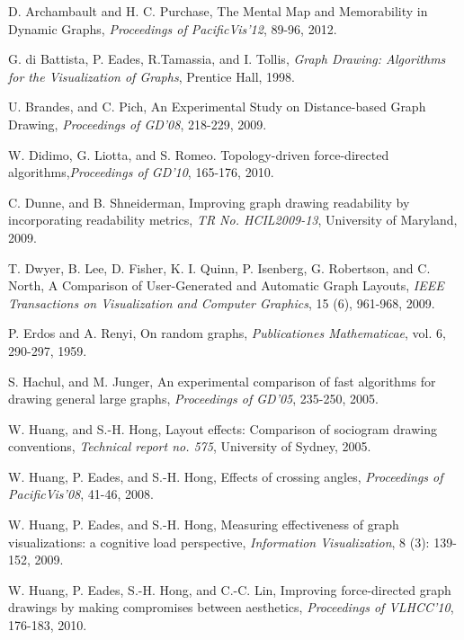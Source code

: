 \documentclass[conference,letterpaper]{IEEEtran}
\begin{document}
\begin{thebibliography}{99}


D. Archambault and H. C. Purchase, The Mental Map and Memorability in Dynamic Graphs, \emph{Proceedings of PacificVis'12}, 89-96, 2012.

G. di Battista, P. Eades, R.Tamassia, and I. Tollis, \emph{Graph Drawing: Algorithms for the Visualization of Graphs}, Prentice Hall, 1998.

U. Brandes, and C. Pich, An Experimental Study on Distance-based Graph Drawing, \emph{Proceedings of GD'08}, 218-229, 2009. 


W. Didimo, G. Liotta, and S. Romeo. Topology-driven force-directed algorithms,\emph{Proceedings of GD'10}, 165-176, 2010.

C. Dunne, and B. Shneiderman, Improving graph drawing
readability by incorporating readability metrics, \emph{TR No. HCIL2009-13}, University of Maryland, 2009.

T. Dwyer, B. Lee, D. Fisher, K. I. Quinn, P. Isenberg, G. Robertson, and C. North, A Comparison of User-Generated and Automatic Graph Layouts, \emph{IEEE Transactions on Visualization and Computer Graphics}, 15 (6), 961-968, 2009.



P. Erdos and A. Renyi, On random graphs, \emph{Publicationes Mathematicae}, vol. 6, 290-297, 1959.

S. Hachul, and M. Junger, An experimental comparison of fast algorithms for drawing general large graphs, \emph{Proceedings of GD'05}, 235-250, 2005.

W. Huang,  and S.-H. Hong, Layout effects: Comparison of sociogram drawing conventions, \emph{Technical report no. 575}, University of Sydney, 2005.


W. Huang, P. Eades, and S.-H. Hong, Effects of crossing angles, \emph{Proceedings of PacificVis'08}, 41-46, 2008.

W. Huang, P. Eades, and S.-H. Hong, Measuring effectiveness of graph visualizations: a cognitive load perspective, \emph{Information Visualization}, 8 (3): 139-152, 2009.

W. Huang, P. Eades, S.-H. Hong, and C.-C. Lin, Improving force-directed graph drawings by making compromises between aesthetics, \emph{Proceedings of VLHCC'10}, 176-183, 2010.


\end{thebibliography}
\end{document}
